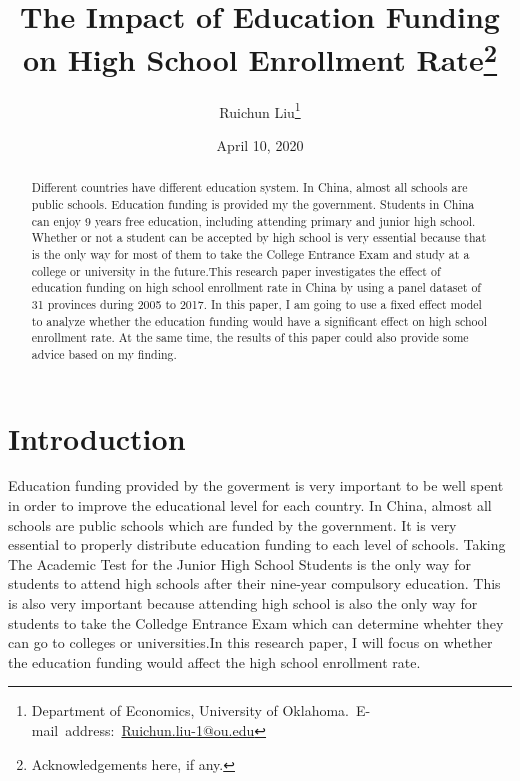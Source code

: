 \documentclass[12pt,english]{article}
\begin{document}
\begin{singlespace}
\title{The Impact of Education Funding on High School Enrollment Rate\thanks{Acknowledgements here, if any.}}
\end{singlespace}

\author{Ruichun Liu\thanks{Department of Economics, University of Oklahoma.\
E-mail~address:~\href{mailto:Ruichun.liu-1@ou.edu}{Ruichun.liu-1@ou.edu}}}

\date{April 10, 2020}

\maketitle

\begin{abstract}
\begin{singlespace}
Different countries have different education system. In China, almost all schools are public schools. Education funding is provided my the government. Students in China can enjoy 9 years free education, including attending primary and junior high school. Whether or not a student can be accepted by high school is very essential because that is the only way for most of them to take the College Entrance Exam and study at a college or university in the future.This research paper investigates the effect of education funding on high school enrollment rate in China by using a panel dataset of 31 provinces during 2005 to 2017. In this paper, I am going to use a fixed effect model to analyze whether the education funding would have a significant effect on high school enrollment rate. At the same time, the results of this paper could also provide some advice based on my finding.
\end{singlespace}

\end{abstract}
\vfill{}


\pagebreak{}


\section{Introduction}\label{sec:intro}
Education funding provided by the goverment is very important to be well spent in order to improve the educational level for each country. In China, almost all schools are public schools which are funded by the government. It is very essential to properly distribute education funding to each level of schools. Taking The Academic Test for the Junior High School Students is the only way for students to attend high schools after their nine-year compulsory education. This is also very important because attending high school is also the only way for students to take the Colledge Entrance Exam which can determine whehter they can go to colleges or universities.In this research paper, I will focus on whether the education funding would affect the high school enrollment rate.\\
\end{document}
